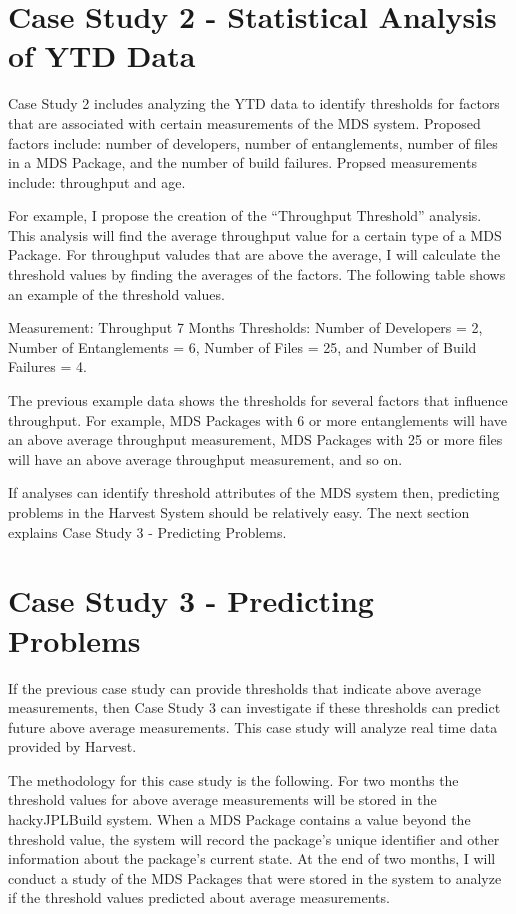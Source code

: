 \section{Case Study 2 - Statistical Analysis of YTD Data}
Case Study 2 includes analyzing the YTD data to identify thresholds for
factors that are associated with certain measurements of the MDS system.
Proposed factors include: number of developers, number of entanglements,
number of files in a MDS Package, and the number of build failures.
Propsed measurements include: throughput and age.

For example, I propose the creation of the ``Throughput Threshold''
analysis.  This analysis will find the average throughput value for a
certain type of a MDS Package.  For throughput valudes that are above the
average, I will calculate the threshold values by finding the averages of
the factors.  The following table shows an example of the threshold values.

Measurement: Throughput 7 Months
Thresholds: Number of Developers = 2, Number of Entanglements = 6, Number
of Files = 25, and Number of Build Failures = 4.

The previous example data shows the thresholds for several factors that
influence throughput.  For example, MDS Packages with 6 or more
entanglements will have an above average throughput measurement, MDS
Packages with 25 or more files will have an above average throughput
measurement, and so on.

If analyses can identify threshold attributes of the MDS system then,
predicting problems in the Harvest System should be relatively easy.  The
next section explains Case Study 3 - Predicting Problems.


\section{Case Study 3 - Predicting Problems}
If the previous case study can provide thresholds that indicate above
average measurements, then Case Study 3 can investigate if these
thresholds can predict future above average measurements.  This case study
will analyze real time data provided by Harvest.

The methodology for this case study is the following.  For two months the
threshold values for above average measurements will be stored in the
hackyJPLBuild system.  When a MDS Package contains a value beyond the
threshold value, the system will record the package's unique identifier and
other information about the package's current state.  At the end of two
months, I will conduct a study of the MDS Packages that were stored in the
system to analyze if the threshold values predicted about average
measurements.

